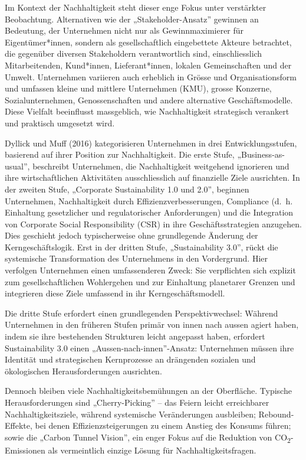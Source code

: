 \documentclass[
  nswissgerman,
  a4paper,
  DIV=11,
  numbers=noendperiod,
  oneside,
  openany]{scrreprt}
\begin{document}
Im Kontext der Nachhaltigkeit steht dieser enge Fokus unter verstärkter
Beobachtung. Alternativen wie der „Stakeholder-Ansatz'' gewinnen an
Bedeutung, der Unternehmen nicht nur als Gewinnmaximierer für
Eigentümer*innen, sondern als gesellschaftlich eingebettete Akteure
betrachtet, die gegenüber diversen Stakeholdern verantwortlich sind,
einschliesslich Mitarbeitenden, Kund*innen, Lieferant*innen, lokalen
Gemeinschaften und der Umwelt. Unternehmen variieren auch erheblich in
Grösse und Organisationsform und umfassen kleine und mittlere
Unternehmen (KMU), grosse Konzerne, Sozialunternehmen, Genossenschaften
und andere alternative Geschäftsmodelle. Diese Vielfalt beeinflusst
massgeblich, wie Nachhaltigkeit strategisch verankert und praktisch
umgesetzt wird.

Dyllick und Muff (2016) kategorisieren Unternehmen in drei
Entwicklungsstufen, basierend auf ihrer Position zur Nachhaltigkeit. Die
erste Stufe, „Business-as-usual'', beschreibt Unternehmen, die
Nachhaltigkeit weitgehend ignorieren und ihre wirtschaftlichen
Aktivitäten ausschliesslich auf finanzielle Ziele ausrichten. In der
zweiten Stufe, „Corporate Sustainability 1.0 und 2.0'', beginnen
Unternehmen, Nachhaltigkeit durch Effizienzverbesserungen, Compliance
(d.~h. Einhaltung gesetzlicher und regulatorischer Anforderungen) und
die Integration von Corporate Social Responsibility (CSR) in ihre
Geschäftsstrategien anzugehen. Dies geschieht jedoch typischerweise ohne
grundlegende Änderung der Kerngeschäftslogik. Erst in der dritten Stufe,
„Sustainability 3.0'', rückt die systemische Transformation des
Unternehmens in den Vordergrund. Hier verfolgen Unternehmen einen
umfassenderen Zweck: Sie verpflichten sich explizit zum
gesellschaftlichen Wohlergehen und zur Einhaltung planetarer Grenzen und
integrieren diese Ziele umfassend in ihr Kerngeschäftsmodell.

Die dritte Stufe erfordert einen grundlegenden Perspektivwechsel:
Während Unternehmen in den früheren Stufen primär von innen nach aussen
agiert haben, indem sie ihre bestehenden Strukturen leicht angepasst
haben, erfordert Sustainability 3.0 einen „Aussen-nach-innen''-Ansatz:
Unternehmen müssen ihre Identität und strategischen Kernprozesse an
drängenden sozialen und ökologischen Herausforderungen ausrichten.

Dennoch bleiben viele Nachhaltigkeitsbemühungen an der Oberfläche.
Typische Herausforderungen sind „Cherry-Picking'' -- das Feiern leicht
erreichbarer Nachhaltigkeitsziele, während systemische Veränderungen
ausbleiben; Rebound-Effekte, bei denen Effizienzsteigerungen zu einem
Anstieg des Konsums führen; sowie die „Carbon Tunnel Vision'', ein enger
Fokus auf die Reduktion von CO\textsubscript{2}-Emissionen als
vermeintlich einzige Lösung für Nachhaltigkeitsfragen.
\end{document}
